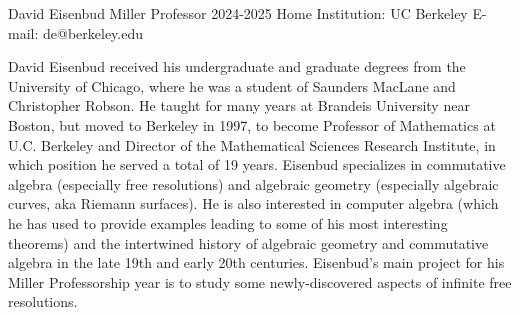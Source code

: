 David Eisenbud
Miller Professor 2024-2025
Home Institution: UC Berkeley
E-mail: de@berkeley.edu

David Eisenbud received his undergraduate and graduate degrees from the University of Chicago, where he was a student of Saunders MacLane and Christopher Robson. He taught for many years at Brandeis University near Boston, but moved to Berkeley in 1997, to become Professor of Mathematics at U.C. Berkeley and Director of the Mathematical Sciences Research Institute, in which position he served a total of 19 years. Eisenbud specializes in commutative algebra (especially free resolutions) and algebraic geometry (especially algebraic curves, aka Riemann surfaces). He is also interested in computer algebra (which he has used to provide examples leading to some of his most interesting theorems) and the intertwined history of algebraic geometry and commutative algebra in the late 19th and early 20th centuries. Eisenbud's main project for his Miller Professorship year is to study some newly-discovered aspects of infinite free resolutions. 
